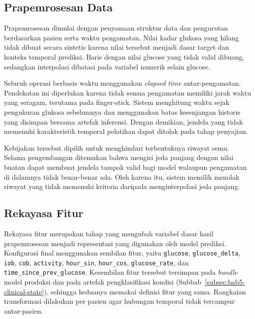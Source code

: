 \subsection{Prapemrosesan Data}
\label{subsec:bab5-prapemrosesan-modul-prediksi}

Prapemrosesan dimulai dengan penyamaan struktur data dan pengurutan berdasarkan pasien serta waktu pengamatan. Nilai kadar glukosa yang hilang tidak dibuat secara
sintetis karena nilai tersebut menjadi dasar target dan konteks temporal prediksi. Baris dengan nilai glucose yang tidak valid dibuang, sedangkan interpolasi dibatasi
pada variabel numerik selain glucose.

Seluruh operasi berbasis waktu menggunakan \textit{elapsed time} antar-pengamatan. Pendekatan ini diperlukan karena tidak semua pengamatan memiliki jarak waktu yang
seragam, terutama pada finger-stick. Sistem menghitung waktu sejak pengukuran glukosa sebelumnya dan menggunakan batas kesenjangan historis yang disimpan bersama
artefak inferensi. Dengan demikian, jendela yang tidak memenuhi karakteristik temporal pelatihan dapat ditolak pada tahap penyajian.

Kebijakan tersebut dipilih untuk menghindari terbentuknya riwayat semu. Selama pengembangan ditemukan bahwa mengisi jeda panjang dengan nilai buatan dapat membuat
jendela tampak valid bagi model walaupun pengamatan di dalamnya tidak benar-benar ada. Oleh karena itu, sistem memilih menolak riwayat yang tidak memenuhi kriteria
daripada menginterpolasi jeda panjang.

\subsection{Rekayasa Fitur}
\label{subsec:bab5-rekayasa-fitur-modul-prediksi}

Rekayasa fitur merupakan tahap yang mengubah variabel dasar hasil prapemrosesan menjadi representasi yang digunakan oleh model prediksi. Konfigurasi final menggunakan
sembilan fitur, yaitu \texttt{glucose}, \texttt{glucose\_delta}, \texttt{iob}, \texttt{cob}, \texttt{activity}, \texttt{hour\_sin}, \texttt{hour\_cos},
\texttt{glucose\_rate}, dan \texttt{time\_since\_prev\_glucose}. Kesembilan fitur tersebut tersimpan pada \textit{bundle} model produksi dan pada artefak pengklasifikasi kondisi (Subbab~\ref{subsec:bab5-clinical-state}), sehingga
keduanya memakai definisi fitur yang sama. Rangkaian transformasi dilakukan per pasien agar hubungan temporal tidak tercampur antar-pasien.

